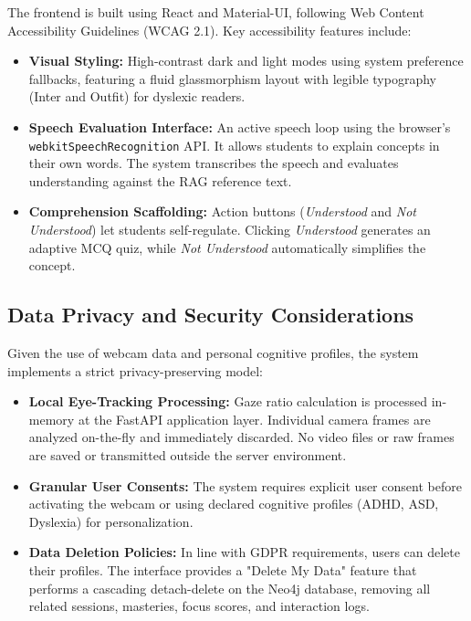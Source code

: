 The frontend is built using React and Material-UI, following Web Content Accessibility Guidelines (WCAG 2.1). 
Key accessibility features include:
\begin{itemize}
    \item \textbf{Visual Styling:} High-contrast dark and light modes using system preference fallbacks, featuring a fluid glassmorphism layout with legible typography (Inter and Outfit) for dyslexic readers.
    \item \textbf{Speech Evaluation Interface:} An active speech loop using the browser's \texttt{webkitSpeechRecognition} API. It allows students to explain concepts in their own words. The system transcribes the speech and evaluates understanding against the RAG reference text.
    \item \textbf{Comprehension Scaffolding:} Action buttons (\textit{Understood} and \textit{Not Understood}) let students self-regulate. Clicking \textit{Understood} generates an adaptive MCQ quiz, while \textit{Not Understood} automatically simplifies the concept.
\end{itemize}

\subsection{Data Privacy and Security Considerations}
\label{subsec:privacy_security}

Given the use of webcam data and personal cognitive profiles, the system implements a strict privacy-preserving model:
\begin{itemize}
    \item \textbf{Local Eye-Tracking Processing:} Gaze ratio calculation is processed in-memory at the FastAPI application layer. Individual camera frames are analyzed on-the-fly and immediately discarded. No video files or raw frames are saved or transmitted outside the server environment.
    \item \textbf{Granular User Consents:} The system requires explicit user consent before activating the webcam or using declared cognitive profiles (ADHD, ASD, Dyslexia) for personalization.
    \item \textbf{Data Deletion Policies:} In line with GDPR requirements, users can delete their profiles. The interface provides a "Delete My Data" feature that performs a cascading detach-delete on the Neo4j database, removing all related sessions, masteries, focus scores, and interaction logs.
\end{itemize}
